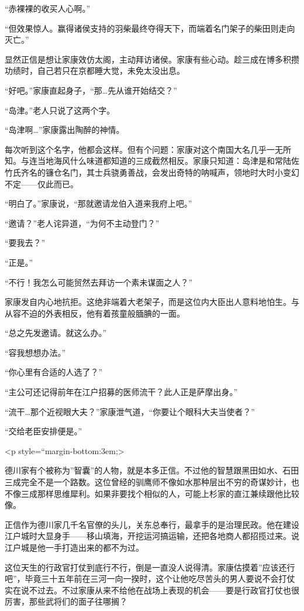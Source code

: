 \documentclass[
]{book}
\begin{document}
``赤裸裸的收买人心啊。''

``但效果惊人。赢得诸侯支持的羽柴最终夺得天下，而端着名门架子的柴田则走向灭亡。''

显然正信是想让家康效仿太阁，主动拜访诸侯。家康有些心动。趁三成在博多积攒功绩时，自己若只在京都睡大觉，未免太没出息。

``好吧。''家康直起身子，``那\ldots 先从谁开始结交？''

``岛津。''老人只说了这两个字。

``岛津啊\ldots{}''家康露出陶醉的神情。

每次听到这个名字，他都会这样。但有个问题：家康对这个南国大名几乎一无所知。与连当地海风什么味道都知道的三成截然相反。家康只知道：岛津是和常陆佐竹氏齐名的镰仓名门，其士兵骁勇善战，会发出奇特的呐喊声，领地时大时小变幻不定------仅此而已。

``明白了。''家康说，``那就邀请龙伯入道来我府上吧。''

``邀请？''老人诧异道，``为何不主动登门？''

``要我去？''

``正是。''

``不行！我怎么可能贸然去拜访一个素未谋面之人？''

家康发自内心地抗拒。这绝非端着大老架子，而是这位内大臣出人意料地怕生。与从容不迫的外表相反，他有着孩童般腼腆的一面。

``总之先发邀请。就这么办。''

``容我想想办法。''

``你心里有合适的人选了？''

``主公可还记得前年在江户招募的医师流干？此人正是萨摩出身。''

``流干\ldots 那个近视眼大夫？''家康泄气道，``你要让个眼科大夫当使者？''

``交给老臣安排便是。''

\textless p style=``margin-bottom:3em;\textgreater{}

德川家有个被称为''智囊''的人物，就是本多正信。不过他的智慧跟黑田如水、石田三成完全不是一个路数。这位曾经的驯鹰师不像如水那种层出不穷的奇谋妙计，也不像三成那样思维犀利。如果非要找个相似的人，可能上杉家的直江兼续跟他比较像。

正信作为德川家几千名官僚的头儿，关东总奉行，最拿手的是治理民政。他在建设江户城时大显身手------移山填海，开挖运河搞运输，还把各地商人都招揽过来。说江户城是他一手打造出来的都不为过。

这位天生的行政官打仗到底行不行，倒是一直没人说得清。家康估摸着''应该还行吧''，毕竟三十五年前在三河一向一揆时，这个让他吃尽苦头的男人要说不会打仗实在说不过去。不过家康从来不给他在战场上表现的机会------要是行政官打仗也很厉害，那些武将们的面子往哪搁？
\end{document}
